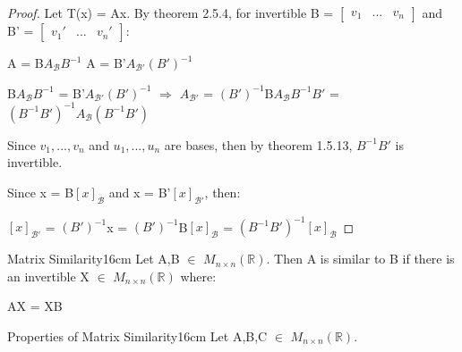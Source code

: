     \begin{proof}
        Let T(x) = Ax. By {\color{red} theorem 2.5.4}, for
        invertible B =
        $\begin{bmatrix}
            v_1 & ... & v_n
        \end{bmatrix}$ and B' =
        $\begin{bmatrix}
            v_1' & ... & v_n'
        \end{bmatrix}$:

        \hspace{0.5cm}
        A = B$A_{\mathcal{B}}B^{-1}$
        \hspace{1cm}
        A = B'$A_{\mathcal{B}'}(B')^{-1}$

        \hspace{0.5cm}
        B$A_{\mathcal{B}}B^{-1}$
        = B'$A_{\mathcal{B}'}(B')^{-1}$
        \hspace{0.5cm}
        $\Rightarrow$
        \hspace{0.5cm}
        $A_{\mathcal{B}'}$
        = $(B')^{-1}$B$A_{\mathcal{B}}B^{-1}B'$
        = $(B^{-1}B')^{-1} A_{\mathcal{B}} (B^{-1}B')$

        Since $v_1,...,v_n$ and $u_1,...,u_n$ are bases, then
        by {\color{red} theorem 1.5.13}, $B^{-1}B'$ is invertible.

        Since x = B$[x]_{\mathcal{B}}$ and x = B'$[x]_{\mathcal{B}'}$, then:
        
        \hspace{0.5cm}
        $[x]_{\mathcal{B}'}$
        = $(B')^{-1}$x
        = $(B')^{-1}$B$[x]_{\mathcal{B}}$
        = $(B^{-1}B')^{-1} [x]_{\mathcal{B}}$
    \end{proof}

    \vspace{0.5cm}



    \begin{definition}{Matrix Similarity}{16cm}
        Let A,B $\in$ $M_{n \times n}(\mathbb{R})$.
        Then A is {\color{lblue} similar} to B if there is an invertible
        X $\in$ $M_{n \times n}(\mathbb{R})$ where:

        \hspace{0.5cm}
        AX = XB
    \end{definition}

    \vspace{0.5cm}



    \begin{wtheorem}{Properties of Matrix Similarity}{16cm}
        Let A,B,C $\in$ $M_{n \times n}(\mathbb{R})$.
    \end{wtheorem}


